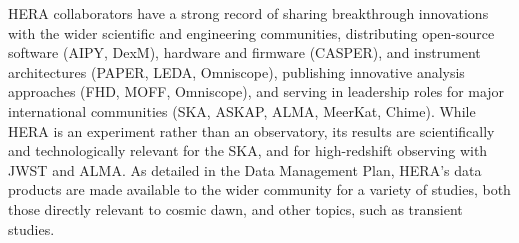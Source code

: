 \documentclass[preprint]{aastex}
\newcommand{\compress}{\vspace{-0.25in}}
\begin{document}
HERA collaborators have a strong record of sharing breakthrough
innovations with the wider scientific and engineering communities, distributing 
open-source software (AIPY, DexM), hardware and firmware (CASPER), 
and instrument architectures (PAPER, LEDA, Omniscope),
publishing innovative analysis approaches (FHD, MOFF,
Omniscope), and serving in leadership roles for major international communities (SKA, ASKAP, ALMA, MeerKat, Chime).  
While HERA is an experiment rather than an observatory, its
results are scientifically and technologically relevant for the
SKA, and for high-redshift observing with JWST and ALMA.
As detailed in the Data Management Plan, HERA's data products are made available to the wider
community for a variety of studies, both those directly
relevant to cosmic dawn, and other topics, such as transient studies. 



\end{document}
